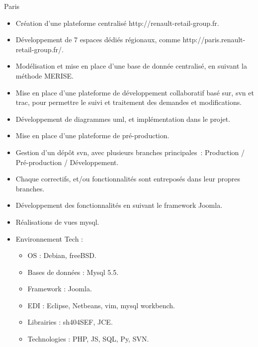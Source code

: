 \documentclass[10pt,a4paper,sans]{moderncv}
\begin{document}
{Paris}{
  \begin{itemize}%
    \item Création d'une plateforme centralisé http://renault-retail-group.fr.
    \item Développement de 7 espaces dédiés régionaux, comme http://paris.renault-retail-group.fr/.
    \item Modélisation et mise en place d'une base de donnée centralisé, en suivant la méthode MERISE.
    \item Mise en place d'une plateforme de développement collaboratif basé sur, svn et trac, pour permettre le suivi et traitement des demandes et modifications.
    \item Développement de diagrammes uml, et implémentation dans le projet.
    \item Mise en place d'une plateforme de pré-production.
    \item Gestion d'un dépôt svn, avec plusieurs branches principales : Production / Pré-production / Développement.
    \item Chaque correctifs, et/ou fonctionnalités sont entreposés dans leur propres branches.
    \item Développement des fonctionnalités en suivant le framework Joomla.
    \item Réalisations de vues mysql.
    \item Environnement Tech :
      \begin{itemize}%
        \item OS : Debian, freeBSD.
        \item Bases de données : Mysql 5.5.
        \item Framework : Joomla.
        \item EDI : Eclipse, Netbeans, vim, mysql workbench.
        \item Librairies : sh404SEF, JCE.
        \item Technologies : PHP, JS, SQL, Py, SVN.
      \end{itemize}
  \end{itemize}}
\end{document}
